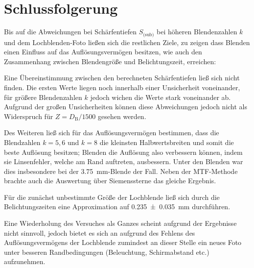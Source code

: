 \section{Schlussfolgerung}
	
	Bis auf die Abweichungen bei Schärfentiefen $S_\text{(sub)}$ bei höheren Blendenzahlen $k$ und dem Lochblenden-Foto ließen sich die restlichen Ziele, zu zeigen dass Blenden einen Einfluss auf das Auflösungsvermögen besitzen, wie auch den Zusammenhang zwischen Blendengröße und Belichtungszeit, erreichen:

	Eine Übereinstimmung zwischen den berechneten Schärfentiefen ließ sich nicht finden.
	Die ersten Werte liegen noch innerhalb einer Unsicherheit voneinander, für größere Blendenzahlen $k$ jedoch wichen die Werte stark voneinander ab.
	Aufgrund der großen Unsicherheiten können diese Abweichungen jedoch nicht als Widerspruch für $Z = D_\text{B}/1500$ gesehen werden.
	
	Des Weiteren ließ sich für das Auflösungsvermögen bestimmen, dass die Blendzahlen $k = 5,6$ und $k = 8$ die kleinsten Halbwertsbreiten und somit die beste Auflösung besitzen; Blenden die Auflösung also verbessern können, indem sie Linsenfehler, welche am Rand auftreten, ausbessern.
	Unter den Blenden war dies insbesondere bei der \SI{3,75}{\milli\meter}-Blende der Fall.
	Neben der MTF-Methode brachte auch die Auswertung über Siemenssterne das gleiche Ergebnis.
	
	Für die zunächst unbestimmte Größe der Lochblende ließ sich durch die Belichtungszeiten eine Approximation auf \SI{0,235+-0,035}{\milli\meter} durchführen. 
	
	Eine Wiederholung des Versuches als Ganzes scheint aufgrund der Ergebnisse nicht sinnvoll, jedoch bietet es sich an aufgrund des Fehlens des Auflösungsvermögens der Lochblende zumindest an dieser Stelle ein neues Foto unter besseren Randbedingungen (Beleuchtung, Schirmabstand etc.) aufzunehmen.
	